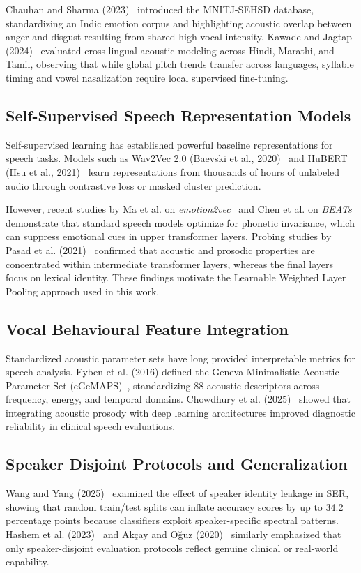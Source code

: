 \documentclass[10pt,journal,compsoc]{IEEEtran}
\begin{document}
Chauhan and Sharma (2023)~\cite{chauhan2023mnitj} introduced the MNITJ-SEHSD database, standardizing an Indic emotion corpus and highlighting acoustic overlap between anger and disgust resulting from shared high vocal intensity. Kawade and Jagtap (2024)~\cite{kawade2024indian} evaluated cross-lingual acoustic modeling across Hindi, Marathi, and Tamil, observing that while global pitch trends transfer across languages, syllable timing and vowel nasalization require local supervised fine-tuning.

\subsection{Self-Supervised Speech Representation Models}
Self-supervised learning has established powerful baseline representations for speech tasks. Models such as Wav2Vec 2.0 (Baevski et al., 2020)~\cite{baevski2020wav2vec2} and HuBERT (Hsu et al., 2021)~\cite{hsu2021hubert} learn representations from thousands of hours of unlabeled audio through contrastive loss or masked cluster prediction.

However, recent studies by Ma et al. on \textit{emotion2vec}~\cite{ma2024emotion2vec} and Chen et al. on \textit{BEATs}~\cite{chen2023beats} demonstrate that standard speech models optimize for phonetic invariance, which can suppress emotional cues in upper transformer layers. Probing studies by Pasad et al. (2021)~\cite{pasad2021layer} confirmed that acoustic and prosodic properties are concentrated within intermediate transformer layers, whereas the final layers focus on lexical identity. These findings motivate the Learnable Weighted Layer Pooling approach used in this work.

\subsection{Vocal Behavioural Feature Integration}
Standardized acoustic parameter sets have long provided interpretable metrics for speech analysis. Eyben et al. (2016) defined the Geneva Minimalistic Acoustic Parameter Set (eGeMAPS)~\cite{eyben2016gemaps}, standardizing 88 acoustic descriptors across frequency, energy, and temporal domains. Chowdhury et al. (2025)~\cite{chowdhury2025speech} showed that integrating acoustic prosody with deep learning architectures improved diagnostic reliability in clinical speech evaluations.

\subsection{Speaker Disjoint Protocols and Generalization}
Wang and Yang (2025)~\cite{wang2025speech} examined the effect of speaker identity leakage in SER, showing that random train/test splits can inflate accuracy scores by up to 34.2 percentage points because classifiers exploit speaker-specific spectral patterns. Hashem et al. (2023)~\cite{hashem2023cross} and Ak\c{c}ay and O\u{g}uz (2020)~\cite{akcay2020speech} similarly emphasized that only speaker-disjoint evaluation protocols reflect genuine clinical or real-world capability.
\end{document}
